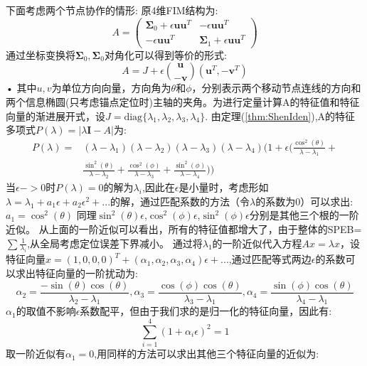 \documentclass[12pt]{article}
\theoremstyle{remark}
\begin{document}
下面考虑两个节点协作的情形:
原4维FIM结构为:
\begin{equation}
A=\left(\begin{array}{cc}
\bm{\Sigma}_0+\epsilon \bm{u}\bm{u}^T &-\epsilon \bm{u}\bm{u}^T \\
-\epsilon \bm{u}\bm{u}^T & \bm{\Sigma}_1+\epsilon \bm{u}\bm{u}^T
\end{array}
\right)
\end{equation}
通过坐标变换将$\bm{\Sigma}_0,\bm{\Sigma}_0$对角化可以得到等价的形式:
\begin{equation}
A=J+\epsilon\binom{\bm{u}}{-\bm{v}}(\bm{u}^T,-\bm{v}^T)
\end{equation}•
其中$u,v$为单位方向向量，方向角为$\theta$和$\phi$，分别表示两个移动节点连线的方向和两个信息椭圆(只考虑锚点定位时)主轴的夹角。为进行定量计算A的特征值和特征向量的渐进展开式，设$J=\text{diag}\{\lambda_1,\lambda_2,\lambda_3,\lambda_4\}$.
由定理(\ref{thm:ShenIden}),A的特征多项式$P(\lambda)=|\lambda \bm{I}-A|$为:
\begin{equation}
\begin{split}
P(\lambda)= &(\lambda-\lambda_1)(\lambda-\lambda_2)(\lambda-\lambda_3)(\lambda-\lambda_4)(1+\epsilon(\frac{\cos^2(\theta)}{\lambda-\lambda_1}+\\
 &\frac{\sin^2(\theta)}{\lambda-\lambda_2}+\frac{\cos^2(\phi)}{\lambda-\lambda_3}+\frac{\sin^2(\phi)}{\lambda-\lambda_4}))
\end{split}
\end{equation}
当$\epsilon ->0$时$P(\lambda)=0$的解为$\lambda_i$,因此在$\epsilon$是小量时，考虑形如$\lambda=\lambda_1+a_1 \epsilon+a_2 \epsilon^2+...$的解，通过匹配系数的方法（令$\lambda$的系数为0）可以求出:
$a_1=\cos^2(\theta)$
同理$\sin^2(\theta)\epsilon$,$\cos^2(\phi)\epsilon$,$\sin^2(\phi)\epsilon$分别是其他三个根的一阶近似。
从上面的一阶近似可以看出，所有的特征值都增大了，由于整体的SPEB=$\sum \frac{1}{\lambda_i}$,从全局考虑定位误差下界减小。
通过将$\lambda_1$的一阶近似代入方程$Ax=\lambda x$，设特征向量$x=(1,0,0,0)^T+(\alpha_1,\alpha_2,\alpha_3,\alpha_4)\epsilon+...$,通过匹配等式两边$\epsilon$的系数可以求出特征向量的一阶扰动为:
\[
\alpha_2=\frac{-\sin(\theta)\cos(\theta)}{\lambda_2-\lambda_1},\alpha_3=\frac{\cos(\phi)\cos(\theta)}{\lambda_3-\lambda_1},\alpha_4=\frac{\sin(\phi)\cos(\theta)}{\lambda_4-\lambda_1}
\]
$\alpha_1$的取值不影响$\epsilon$系数配平，但由于我们求的是归一化的特征向量，因此有:
\begin{equation}
\sum_{i=1}^4(1+\alpha_i \epsilon)^2=1
\end{equation}
取一阶近似有$\alpha_1=0$,用同样的方法可以求出其他三个特征向量的近似为:
\end{document}

